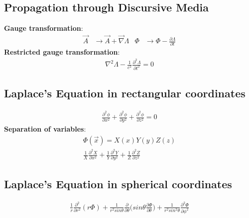 \documentclass[a4paper, 11pt, landscape]{article}
\begin{document}
\begin{multicols*}{3}
\subsection{Propagation through Discursive Media}
\begin{compactenum}
\textbf{Gauge transformation}:
    \begin{align*}
        \vec{A} &\rightarrow \vec{A} + \vec{\nabla}\Lambda &
        \Phi &\rightarrow \Phi - \frac{\partial \Lambda}{\partial t}
    \end{align*}
    \textbf{Restricted gauge transformation}:
     \begin{align*}
        \nabla^{2} \Lambda - \frac{1}{c^{2}}\frac{\partial^{2} \Lambda}{\partial t^{2}} = 0
    \end{align*}
\end{compactenum}

\subsection{Laplace's Equation in rectangular coordinates}
\begin{compactenum}
    \begin{align*}
        \frac{\partial^{2} \phi}{\partial x^{2}} + \frac{\partial^{2} \phi}{\partial y^{2}} + \frac{\partial^{2} \phi}{\partial z^{2}} = 0
    \end{align*}
    \textbf{Separation of variables}:
     \begin{align*}
        \Phi(\vec{x}) = X(x)Y(y)Z(z) \\
        \frac{1}{X} \frac{\partial^{2} X}{\partial x^{2}} + 
        \frac{1}{Y} \frac{\partial^{2} Y}{\partial y^{2}} +
        \frac{1}{Z} \frac{\partial^{2} Z}{\partial z^{2}}
    \end{align*}
\end{compactenum}

\subsection{Laplace's Equation in spherical coordinates}
\begin{compactenum}
    \begin{align*}
        \frac{1}{r} \frac{\partial^{2}}{\partial r^{2}} (r\Phi) + \frac{1}{r^{2}sin\theta} \frac{\partial}{\partial \theta}\Big(sin\theta \frac{\partial \Phi}{\partial \theta} \Big) + \frac{1}{r^{2}sin^{2}\theta} \frac{\partial^{2}\Phi}{\partial \phi^{2}}
    \end{align*}
\end{compactenum}


\end{multicols*}
\end{document}
